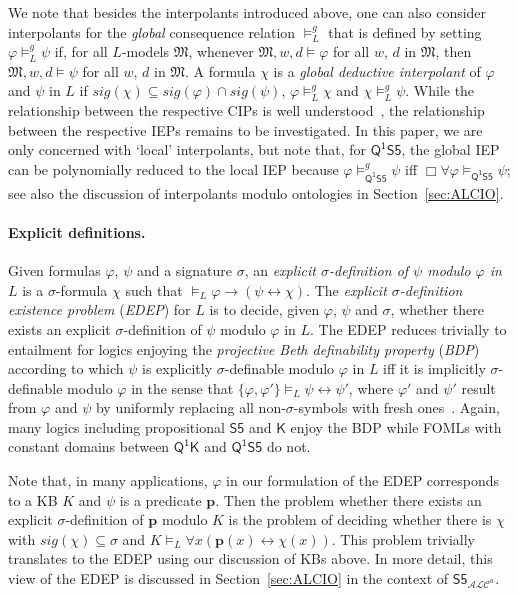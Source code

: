 \documentclass[10pt,a4paper]{amsart}
\theoremstyle{plain}
\theoremstyle{definition}
\newcommand{\sig}{\mathit{sig}}
\newcommand{\SF}{\ensuremath{\mathsf{S5}}}
\newcommand{\FOMK}{\ensuremath{\mathsf{Q^1K}}}
\newcommand{\FOMS}{\ensuremath{\mathsf{Q^1S5}}}
\newcommand{\fform}[1]{\boldsymbol{#1}}
\newcommand{\pvar}{\fform{p}}
\newcommand{\ALCIOS}{\ensuremath{\mathsf{S5}_{\mathcal{ALC}^u}}}
\begin{document}
We note that besides the interpolants introduced above, one can also consider interpolants for the \emph{global} consequence relation $\models_{L}^{g}$ that is defined by setting $\varphi\models_{L}^{g}\psi$ if, for all $L$-models $\mathfrak{M}$, whenever $\mathfrak{M},w,d\models \varphi$ for all $w$, $d$ in $\mathfrak{M}$, then $\mathfrak{M},w,d\models \psi$ for all $w$, $d$ in $\mathfrak{M}$. A formula $\chi$ is a \emph{global deductive interpolant} of $\varphi$ and $\psi$ in $L$ if $\sig(\chi) \subseteq \sig(\varphi) \cap \sig(\psi)$, $\varphi\models_L^{g} \chi$ and $\chi \models_L^{g} \psi$. While the relationship between the respective CIPs is well understood~\cite{chapter:nonclassical}, the relationship between the respective IEPs remains to be investigated. In this paper, we are only concerned with `local' interpolants, but note that, for $\FOMS$, the global IEP can be polynomially reduced to the local IEP because $\varphi\models_{\FOMS}^{g}\psi$ iff $\Box\forall \varphi \models_{\FOMS}\psi$; see also the discussion of interpolants modulo ontologies in Section~\ref{sec:ALCIO}.

\paragraph{Explicit definitions.} Given formulas $\varphi$, $\psi$ and a signature $\sigma$, 
an \emph{explicit $\sigma$-definition of $\psi$ modulo $\varphi$ in $L$} is a $\sigma$-formula $\chi$ such that 
$\models_L\varphi\to(\psi\leftrightarrow\chi)$. 
The \emph{explicit $\sigma$-definition existence problem} (\emph{EDEP}) for $L$ is to decide, given $\varphi$, $\psi$ and $\sigma$, whether there exists an explicit $\sigma$-definition of $\psi$ modulo $\varphi$ in $L$. The 
EDEP reduces trivially to entailment for logics enjoying the \emph{projective Beth definability property} (\emph{BDP})  according to which $\psi$ is explicitly $\sigma$-definable modulo $\varphi$ in $L$ iff it is implicitly $\sigma$-definable modulo $\varphi$ in the sense that $\{\varphi,\varphi'\}\models_{L} \psi \leftrightarrow \psi'$, where $\varphi'$ and $\psi'$ result from $\varphi$ and $\psi$ by uniformly replacing all non-$\sigma$-symbols with fresh ones~\cite{modeltheory}. Again, many logics including propositional $\SF$ and $\mathsf{K}$ enjoy the BDP while FOMLs with constant domains between $\FOMK$ and $\FOMS$ do not. 

Note that, in many applications, $\varphi$ in our formulation of the EDEP corresponds to a KB $K$ and $\psi$ is a predicate $\pvar$. Then the problem whether there exists an explicit $\sigma$-definition of $\pvar$ modulo $K$ is the problem of deciding whether there is $\chi$ with $\sig(\chi) \subseteq \sigma$ and  $K\models_{L}\forall x(\pvar(x) \leftrightarrow \chi(x))$. This problem trivially translates to the EDEP using our discussion of KBs above. In more detail, this view of the EDEP is discussed in Section~\ref{sec:ALCIO} in the context of $\ALCIOS$.
\end{document}
